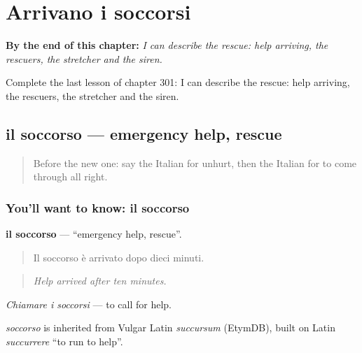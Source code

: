 
\chapter{Arrivano i soccorsi}
\label{ch:it-arrivano-i-soccorsi}

\begin{chapteropening}
\textbf{By the end of this chapter:} \emph{I can describe the rescue: help arriving, the rescuers, the stretcher and the siren.}

Complete the last lesson of chapter 301: I can describe the rescue: help arriving, the rescuers, the stretcher and the siren.
\end{chapteropening}

\section[il soccorso]{il soccorso — emergency help, rescue}

\label{lesson:IT-C301-soccorso}



\begin{quote}
Before the new one: say the Italian for unhurt, then the Italian for to come through all right.
\end{quote}

\subsection*{You'll want to know: il soccorso}
\textbf{il soccorso} — \textquotedblleft{}emergency help, rescue\textquotedblright{}.

\begin{quote}
Il soccorso è arrivato dopo dieci minuti.
\end{quote}

\begin{quote}
\emph{Help arrived after ten minutes.}
\end{quote}

\emph{Chiamare i soccorsi} — to call for help.

\begin{cousinweb}
\emph{soccorso} is inherited from Vulgar Latin \emph{succursum} (EtymDB), built on Latin \emph{succurrere} \textquotedblleft{}to run to help\textquotedblright{}.
\end{cousinweb}

